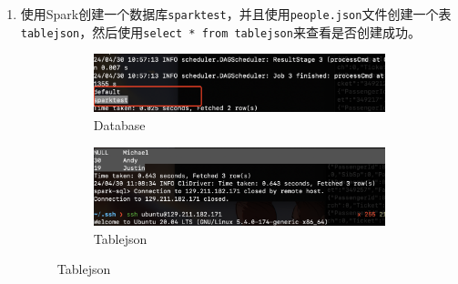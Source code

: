 \documentclass{article}
\begin{document}
\begin{enumerate}
\begin{figure}[H]
    \end{figure}
    \item 使用Spark创建一个数据库\texttt{sparktest}，并且使用\texttt{people.json}文件创建一个表
    \texttt{tablejson}，然后使用\texttt{select * from tablejson}来查看是否创建成功。
    \begin{figure}[H]
        \begin{subfigure}{0.5\textwidth}
            \centering
            \includegraphics[width=\textwidth]{databases.png}
            \caption*{Database}
        \end{subfigure}
        \hfill
        \begin{subfigure}{0.45\textwidth}
            \centering
            \includegraphics[width=\textwidth]{table.png}
            \caption*{Tablejson}
        \end{subfigure}
    \end{figure}
\end{enumerate}
\end{document}
